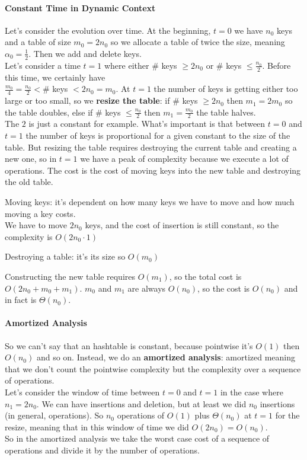 \documentclass[10pt]{report}
\begin{document}
\paragraph{Constant Time in Dynamic Context} Let's consider the evolution over time. At the beginning, $t=0$ we have $n_0$ keys and a table of size $m_0 = 2n_0$ so we allocate a table of twice the size, meaning $\alpha_0 = \frac{1}{2}$. Then we add and delete keys.\\
Let's consider a time $t=1$ where either \# keys $\geq 2n_0$ or \# keys $\leq \frac{n_0}{2}$. Before this time, we certainly have\\$\frac{m_0}{4} = \frac{n_0}{2} < \#$ keys $< 2n_0=m_0$. At $t=1$ the number of keys is getting either too large or too small, so we \textbf{resize the table}: if $\#$ keys $\geq 2n_0$ then $m_1 = 2m_0$ so the table doubles, else if $\#$ keys $\leq \frac{n_0}{2}$ then $m_1 = \frac{m_0}{2}$ the table halves.\\
The $2$ is just a constant for example. What's important is that between $t=0$ and $t=1$ the number of keys is proportional for a given constant to the size of the table. But resizing the table requires destroying the current table and creating a new one, so in $t=1$ we have a peak of complexity because we execute a lot of operations. The cost is the cost of moving keys into the new table and destroying the old table.\begin{list}{}{}
	\item Moving keys: it's dependent on how many keys we have to move and how much moving a key costs.\\
	We have to move $2n_0$ keys, and the cost of insertion is still constant, so the complexity is $O(2n_0\cdot 1)$
	\item Destroying a table: it's its size so $O(m_0)$
\end{list}
Constructing the new table requires $O(m_1)$, so the total cost is $O(2n_0+m_0+m_1)$. $m_0$ and $m_1$ are always $O(n_0)$, so the cost is $O(n_0)$ and in fact is $\Theta(n_0)$.
\paragraph{Amortized Analysis} So we can't say that an hashtable is constant, because pointwise it's $O(1)$ then $O(n_0)$ and so on. Instead, we do an \textbf{amortized analysis}: amortized meaning that we don't count the pointwise complexity but the complexity over a sequence of operations.\\
Let's consider the window of time between $t=0$ and $t=1$ in the case where $n_1=2n_0$. We can have insertions and deletion, but at least we did $n_0$ insertions (in general, operations). So $n_0$ operations of $O(1)$ plus $\Theta(n_0)$ at $t=1$ for the resize, meaning that in this window of time we did $O(2n_0)=O(n_0)$.\\
So in the amortized analysis we take the worst case cost of a sequence of operations and divide it by the number of operations.
\end{document}
